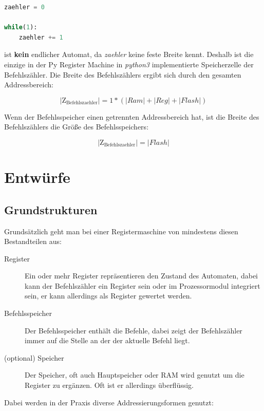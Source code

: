 \documentclass[a4paper,12pt,oneside]{scrreprt}
\begin{document}
\begin{lstlisting}[frame=single,language=python]
zaehler = 0

while(1):
	zaehler += 1
\end{lstlisting}

ist \textbf{kein} endlicher Automat, da \textit{zaehler} keine feste Breite kennt. 
Deshalb ist die einzige in der Py Register Machine in \textit{python3} implementierte Speicherzelle der Befehlszähler.
Die Breite des Befehlszählers ergibt sich durch den gesamten Addressbereich:

$$ \mathrm{|Z_{Befehlszaehler}|} = 1 * ( |Ram| + |Reg| + |Flash| ) $$

Wenn der Befehlsspeicher einen getrennten Addressbereich hat, ist die Breite des Befehlszählers die Größe des Befehlsspeichers:

$$ \mathrm{|Z_{Befehlszaehler}|} = |Flash|  $$

\chapter{Entwürfe}

\section{Grundstrukturen}

Grundsätzlich geht man bei einer Registermaschine von mindestens diesen Bestandteilen aus:

\begin{description}

\item[Register] Ein oder mehr Register repräsentieren den Zustand des Automaten, dabei kann der Befehlszähler ein Register sein oder im Prozessormodul integriert sein, er kann allerdings als Register gewertet werden.

\item[Befehlsspeicher] Der Befehlsspeicher enthält die Befehle, dabei zeigt der Befehlszähler immer auf die Stelle an der der aktuelle Befehl liegt.

\item[(optional) Speicher] Der Speicher, oft auch Hauptspeicher oder RAM wird genutzt um die Register zu ergänzen. Oft ist er allerdings überflüssig. 
\end{description}

Dabei werden in der Praxis diverse Addressierungsformen genutzt:
\end{document}
